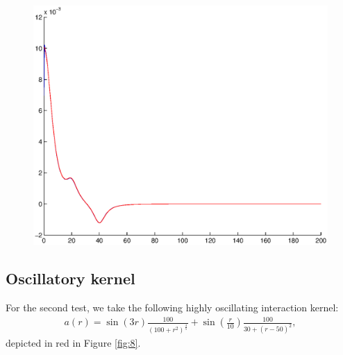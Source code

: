 \documentclass[A4paper,11pt]{article}
\theoremstyle{definition}
\begin{document}
\begin{figure}[H]
\begin{minipage}{.33\textwidth}
  \centering
  \vspace{0.2cm}
  \includegraphics[scale=0.25]{pictures/Example7/Fig7.eps}
  \label{fig:7_7}
\end{minipage}%
\caption{}
\label{fig:7}
\end{figure}

\subsection{Oscillatory kernel}

For the second test, we take the following highly oscillating interaction kernel:
\begin{align*}
a(r) = \sin(3r) \frac{100}{(100+r^2)^{\frac{4}{5}}} + \sin\left(\frac{r}{10}\right) \frac{100}{30 + (r - 50)^2},
\end{align*}
depicted in red in Figure \ref{fig:8}.
\end{document}
